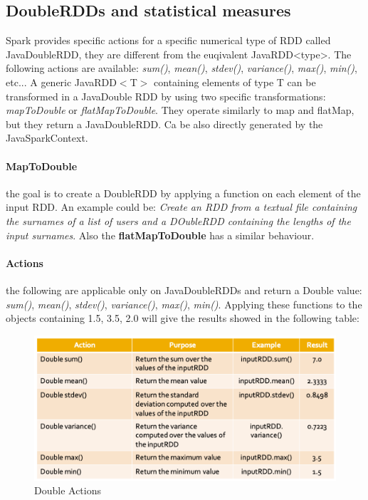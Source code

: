 \documentclass[12pt]{article}
\begin{document}
\subsection{DoubleRDDs and statistical measures}
Spark provides specific actions for a specific numerical type of RDD called JavaDoubleRDD, they are different from the euqivalent JavaRDD<type>. The following actions are available: \textit{sum()}, \textit{mean()}, \textit{stdev()}, \textit{variance()}, \textit{max()}, \textit{min()}, etc... A generic JavaRDD$<$T$>$ containing elements of type T can be transformed in a JavaDouble RDD by using two specific transformations: \textit{mapToDouble} or \textit{flatMapToDouble}. They operate similarly to map and flatMap, but they return a JavaDoubleRDD. Ca be also directly generated by the JavaSparkContext.
\paragraph{MapToDouble} the goal is to create a DoubleRDD by applying a function on each element of the input RDD. An example could be: \textit{Create an RDD from a textual file containing the surnames of a list of users and a DOubleRDD containing the lengths of the input surnames}. Also the \textbf{flatMapToDouble} has a similar behaviour.
\paragraph{Actions} the following are applicable only on JavaDoubleRDDs and return a Double value: \textit{sum()}, \textit{mean()}, \textit{stdev()}, \textit{variance()}, \textit{max()}, \textit{min()}. Applying these functions to the objects containing {1.5, 3.5, 2.0} will give the results showed in the following table:
\begin{figure}[H]
  \includegraphics[width=\linewidth]{images/DoubleActions.png}
  \caption{Double Actions}
  \label{fig:DoubleActions}
\end{figure}
\end{document}
